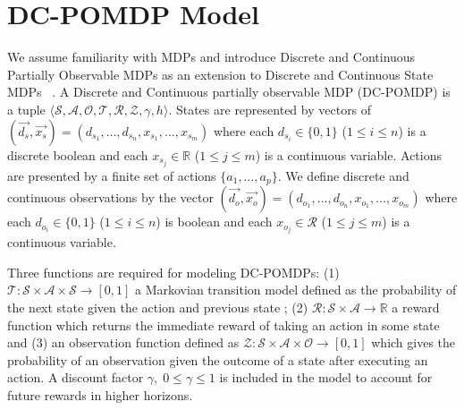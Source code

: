 \documentclass{article} %
\begin{document}
\section{DC-POMDP Model} 
We assume familiarity with MDPs and introduce Discrete and Continuous Partially Observable MDPs as an extension to Discrete and Continuous State MDPs ~\cite{sanner_uai11}. A Discrete and Continuous partially observable MDP (DC-POMDP) is a tuple $\langle
\mathcal{S},\mathcal{A},\mathcal{O},\mathcal{T},\mathcal{R},\mathcal{Z},\gamma,h \rangle$. 
States are represented by vectors of $(\vec{d_s},\vec{x_s}) = ( d_{s_1},\ldots,d_{s_n},x_{s_1},\ldots,x_{s_m} )$ where each $d_{s_i} \in \{ 0,1 \}$ ($1 \leq i \leq n$) is a discrete boolean and each $x_{s_j} \in  \mathbb{R}$ ($1 \leq j \leq m$) is a continuous variable. Actions are presented by a finite set of actions $\{ a_1, \ldots, a_p \}$. We define discrete and continuous observations by the vector $(\vec{d_o},\vec{x_o}) = ( d_{o_1},\ldots,d_{o_n},x_{o_1},\ldots,x_{o_m} )$ where each $d_{o_i} \in \{ 0,1 \}$ ($1 \leq i \leq n$) is boolean and each $x_{o_j} \in \mathcal{R}$ ($1 \leq j \leq m$) is a continuous variable. 

Three functions are required for modeling DC-POMDPs: (1) $\mathcal{T}: \mathcal{S} \times \mathcal{A} \times \mathcal{S} \rightarrow  [ 0, 1 ]$ a Markovian transition model defined as the probability of the next state given the action and previous state %
; (2)  $\mathcal{R}:\mathcal{S}\times\mathcal{A} \rightarrow \mathbb{R}$ a reward function which returns the immediate reward of taking an action in some state and (3) an observation function defined as $\mathcal{Z} : \mathcal{S} \times \mathcal{A} \times \mathcal{O} \rightarrow [ 0, 1 ]$  which gives the probability of an observation given the outcome of a state after executing an action.  A discount factor $\gamma, \; 0 \leq \gamma \leq 1$ is included in the model to account for future rewards in higher horizons.
\end{document}
